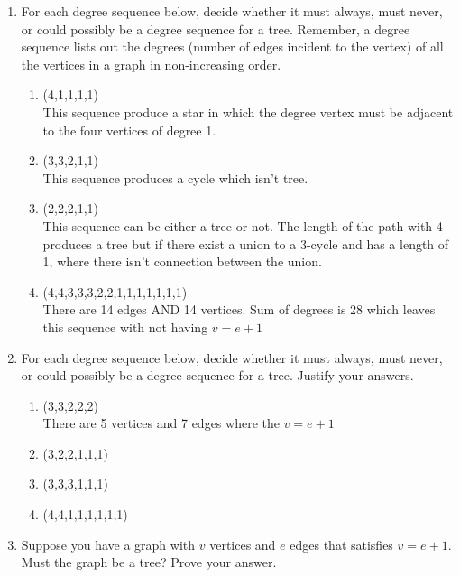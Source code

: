 \documentclass[11pt,a4paper]{article}
\newcommand\setItemNumber[1]{\setcounter{enumi}{\numexpr#1-1\relax}}
\begin{document}
        \begin{enumerate}

        \setItemNumber{2}
        \item For each degree sequence below, decide whether it must always, must never, or could possibly be a degree sequence for a tree. Remember, a degree sequence lists out the degrees (number of edges incident to the vertex) of all the vertices in a graph in non-increasing order.\\
            \begin{enumerate}
                \item (4,1,1,1,1)\\
                    This sequence produce a star in which the  degree vertex must be adjacent to the four vertices of degree 1.
                \item (3,3,2,1,1)\\
                    This sequence produces a cycle which isn't tree.
                \item (2,2,2,1,1)\\
                    This sequence can be either a tree or not. The length of the path with 4 produces a tree but if there exist a union to a 3-cycle and has a length of 1, where there isn't connection between the union.
                \item (4,4,3,3,3,2,2,1,1,1,1,1,1,1)\\
                    There are 14 edges AND 14 vertices. Sum of degrees is 28 which leaves this sequence with not having $v = e + 1$
            \end{enumerate}

        \item For each degree sequence below, decide whether it must always, must never, or could possibly be a degree sequence for a tree. Justify your answers.

            \begin{enumerate}
                \item (3,3,2,2,2)\\
                    There are 5 vertices and 7 edges where the $v = e + 1$
                \item (3,2,2,1,1,1)
                \item (3,3,3,1,1,1)
                \item (4,4,1,1,1,1,1,1)
            \end{enumerate}

        \item Suppose you have a graph with $v$ vertices and $e$ edges that satisfies $v=e+1$. Must the graph be a tree? Prove your answer.


\end{enumerate}
\end{document}
